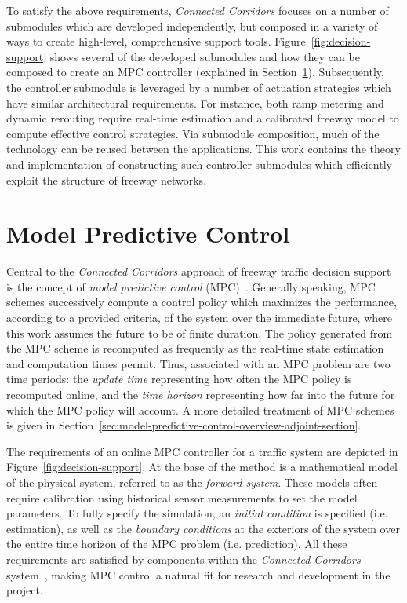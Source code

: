 To satisfy the above requirements, \emph{Connected Corridors} focuses on a number of submodules which are developed independently, but composed in a variety of ways to create high-level, comprehensive support tools. Figure~\ref{fig:decision-support} shows several of the developed submodules and how they can be composed to create an MPC controller (explained in Section~\ref{sec:model-predictive-control}). Subsequently, the controller submodule is leveraged by a number of actuation strategies which have similar architectural requirements. For instance, both ramp metering and dynamic rerouting require real-time estimation and a calibrated freeway model to compute effective control strategies. Via submodule composition, much of the technology can be reused between the applications. This work contains the theory and implementation of constructing such controller submodules which efficiently exploit the structure of freeway networks.

\section{Model Predictive Control}
\label{sec:model-predictive-control}

Central to the \emph{Connected Corridors} approach of freeway traffic decision support is the concept of \emph{model predictive control} (MPC)~\cite{Muralidharana,Donoghue2013Splitting,Frejo2011}. Generally speaking, MPC schemes successively compute a control policy which maximizes the performance, according to a provided criteria, of the system over the immediate future, where this work assumes the future to be of finite duration. The policy generated from the MPC scheme is recomputed as frequently as the real-time state estimation and computation times permit. Thus, associated with an MPC problem are two time periods: the \emph{update time} representing how often the MPC policy is recomputed online, and the \emph{time horizon} representing how far into the future for which the MPC policy will account. A more detailed treatment of MPC schemes is given in Section~\ref{sec:model-predictive-control-overview-adjoint-section}.

The requirements of an online MPC controller for a traffic system are depicted in Figure~\ref{fig:decision-support}. At the base of the method is a mathematical model of the physical system, referred to as the \emph{forward system}. These models often require calibration using historical sensor measurements to set the model parameters. To fully specify the simulation, an \emph{initial condition} is specified (i.e. estimation), as well as the \emph{boundary conditions} at the exteriors of the system over the entire time horizon of the MPC problem (i.e. prediction). All these requirements are satisfied by components within the \emph{Connected Corridors} system~\cite{Muralidharan2009b,dervisoglu2014macroscopic,work2010traffic}, making MPC control a natural fit for research and development in the project.

